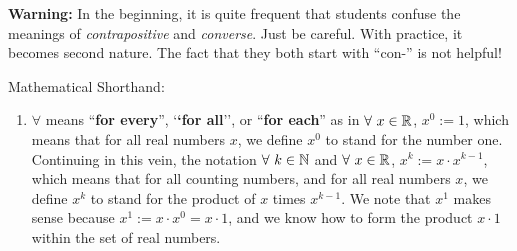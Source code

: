     
    \textbf{Warning:} In the beginning, it is quite frequent that students confuse the meanings of \emph{contrapositive} and \emph{converse}. Just be careful. With practice, it becomes second nature. The fact that they both start with ``con-'' is not helpful!

\bigskip


 
\begin{tcolorbox}[colback = mylightblue, title=\textbf{(Optional Read:) Symbology of Mathematics:}, breakable]


\begin{definition} Mathematical Shorthand:
   
\begin{enumerate}
\renewcommand{\labelenumi}{(\alph{enumi})}
\setlength{\itemsep}{.2cm}
                      
        \item  $\forall$ means ``\textbf{for every}'', `\textbf{`for all}'', or ``\textbf{for each}'' as in $\forall~x\in \mathbb R$, $x^0:= 1$, which means that for all real numbers $x$, we define $x^0$ to stand for the number one. Continuing in this vein, the notation $\forall~k \in \mathbb N$ and $\forall~x\in \mathbb R$, $x^k:= x\cdot x^{k-1}$, which means that for all counting numbers, and for all real numbers $x$, we define $x^k$ to stand for the product of $x$ times $x^{k-1}$. We note that $x^1$ makes sense because $x^1:= x \cdot x^0 = x \cdot 1$, and we know how to form the product $x \cdot 1$ within the set of real numbers.


\end{enumerate}
\end{definition}
\end{tcolorbox}

